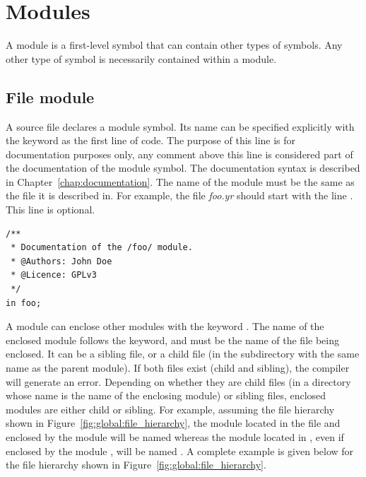 \section{Modules}%
\label{sec:global:modules}

A module is a first-level symbol that can contain other types of symbols. Any
other type of symbol is necessarily contained within a module.

\subsection{File module}

A source file declares a module symbol. Its name can be specified explicitly
with the keyword  as the first line of code. The purpose of this line
is for documentation purposes only, any comment above this line is considered
part of the documentation of the module symbol. The documentation syntax is
described in Chapter~\ref{chap:documentation}. The name of the module must
be the same as the file it is described in. For example, the file
\textit{foo.yr} should start with the line . This line is
optional.


\begin{lstlisting}[style=coloredverbatim]
/**
 * Documentation of the /foo/ module.
 * @Authors: John Doe
 * @Licence: GPLv3
 */
in foo;
\end{lstlisting}

A module can enclose other modules with the keyword . The name of
the enclosed module follows the keyword, and must be the name of the file being
enclosed. It can be a sibling file, or a child file (in the subdirectory with
the same name as the parent module). If both files exist (child and sibling),
the compiler will generate an error. Depending on whether they are child files
(in a directory whose name is the name of the enclosing module) or sibling
files, enclosed modules are either child or sibling. For example, assuming the
file hierarchy shown in Figure~\ref{fig:global:file_hierarchy}, the module located in
the file  and enclosed by the module  will
be named  whereas the module located in , even
if enclosed by the module , will be named . A complete
example is given below for the file hierarchy shown in
Figure~\ref{fig:global:file_hierarchy}.



